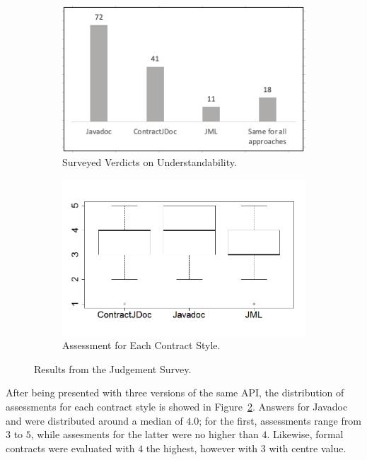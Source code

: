 \begin{figure}
\centering
\begin{subfigure}{.45\textwidth}
\includegraphics[width=0.8\linewidth]{figs/mostUnderstandable.png}
\caption{Surveyed Verdicts on Understandability.}
\label{fig:understand}
\end{subfigure}
\begin{subfigure}{.48\textwidth}
\includegraphics[width=1\linewidth]{figs/boxplotApproachesSurveyStudy}
\caption{Assessment for Each Contract Style.}
\label{fig:surveyResults}
\end{subfigure}
\caption{Results from the Judgement Survey.}
\label{fig:survey}
\end{figure}


After being presented with three versions of the same API, the distribution of assessments for each contract style is showed in Figure~\ref{fig:surveyResults}.
Answers for Javadoc and \contractjdoc{} were distributed around a median of $4.0$; for the first, assessments range from $3$ to $5$, while assesments for the latter were no higher than $4$.
Likewise, formal contracts were evaluated with $4$ the highest, however with $3$ with centre value. 

